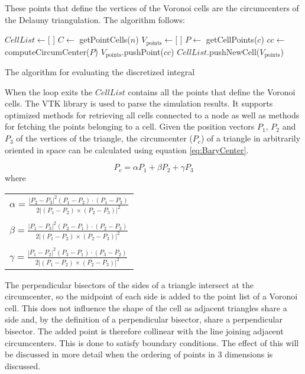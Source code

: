 These points that define the vertices of the Voronoi cells are the circumcenters of the Delauny triangulation. The algorithm follows:

\begin{algorithm}
    \begin{algorithmic}
        \State $ CellList \gets $[ ]
            \State $C \gets $ getPointCells($n$)
            \State $V_{\text{points}} \gets $[ ] 
                \State $P \gets $ getCellPoints($c$)
                \State $cc \gets $ computeCircumCenter($P$)
                \State $V_{\text{points}}$.pushPoint($cc$)
            \EndFor
            \State $CellList$.pushNewCell($V_{\text{points}}$)
        \EndFor
    \end{algorithmic}
    \caption{The algorithm for evaluating the discretized integral}
\end{algorithm}
When the loop exits the $CellList$ contains all the points that define the Voronoi cells. The VTK library is used to parse the simulation results. It supports optimized methods for retrieving all cells connected to a node as well as methods for fetching the points belonging to a cell. Given the position vectors $P_1$, $P_2$ and $P_3$ of the vertices of the triangle, the circumcenter ($P_c$) of a triangle in arbitrarily oriented in space can be calculated using equation \ref{eq:BaryCenter}.

\begin{equation}
    P_c = \alpha P_1 + \beta P_2 + \gamma P_3
    \label{eq:BaryCenter}
\end{equation}
where 
\begin{table}[h]
    \centering
    \begin{tabular}{l}
        $\alpha = \frac{|P_2 - P_3|^2(P_1-P_2)\cdot(P_1-P_3)}{2|(P_1-P_2)\times (P_2 - P_3)|^2}$\\
        \\
        $\beta  = \frac{|P_1 - P_3|^2(P_2-P_1)\cdot(P_2-P_3)}{2|(P_1-P_2)\times (P_2 - P_3)|^2}$\\
        \\
        $\gamma = \frac{|P_1 - P_2|^2(P_3-P_1)\cdot(P_3-P_2)}{2|(P_1-P_2)\times (P_2 - P_3)|^2}$\\
    \end{tabular}
\end{table}
The perpendicular bisectors of the sides of a triangle intersect at the circumcenter, so the midpoint of each side is added to the point list of a Voronoi cell. This does not influence the shape of the cell as adjacent triangles share a side and, by the definition of a perpendicular bisector, share a perpendicular bisector. The added point is therefore collinear with the line joining adjacent circumcenters. This is done to satisfy boundary conditions. The effect of this will be discussed in more detail when the ordering of points in 3 dimensions is discussed.
